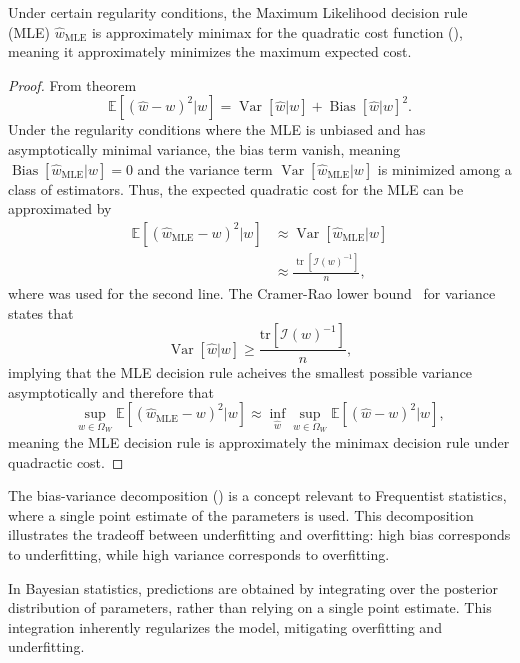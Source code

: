 \begin{corollary}
	\label{cor:MLE_minimax}
	Under certain regularity conditions, the Maximum Likelihood decision rule (MLE) $\hat{w}_{\text{MLE}}$ is approximately minimax for the quadratic cost function (), meaning it approximately minimizes the maximum expected cost.
	
	\begin{proof}
		From theorem 
		\begin{equation}
			\mathbb{E}[(\hat{w}-w)^2|w] = \operatorname{Var}[\hat{w}|w]+\operatorname{Bias}[\hat{w}|w]^2.
		\end{equation}
		Under the regularity conditions where the MLE is unbiased and has asymptotically minimal variance, the bias term vanish, meaning $\operatorname{Bias}[\hat{w}_{\text{MLE}}|w] = 0$ and the variance term $\operatorname{Var}[\hat{w}_{\text{MLE}}|w]$ is minimized among a class of estimators. Thus, the expected quadratic cost for the MLE can be approximated by
		\begin{equation}
			\begin{split}
				\mathbb{E}[(\hat{w}_{\text{MLE}}-w)^2|w] &\approx \operatorname{Var}[\hat{w}_{\text{MLE}}|w]\\
				&\approx \frac{\operatorname{tr}[\mathcal{I}(w)^{-1}]}{n},
			\end{split}
		\end{equation}
		where  was used for the second line. The Cramer-Rao lower bound~\citep{Rao1973Linear} for variance states that 
		\begin{equation}
			\operatorname{Var}[\hat{w}|w]\geq \frac{\text{tr}[\mathcal{I}(w)^{-1}]}{n},
		\end{equation}
		implying that the MLE decision rule acheives the smallest possible variance asymptotically and therefore that 
		\begin{equation}
			\sup_{w\in \Omega_W}\mathbb{E}[(\hat{w}_{\text{MLE}}-w)^2|w]\approx \inf_{\hat{w}} \sup_{w \in \Omega_W} \mathbb{E}[(\hat{w} - w)^2|w],
		\end{equation}
		meaning the MLE decision rule is approximately the minimax decision rule under quadractic cost.
	\end{proof}
\end{corollary}

\begin{example}
	The bias-variance decomposition () is a concept relevant to Frequentist statistics, where a single point estimate of the parameters is used. This decomposition illustrates the tradeoff between underfitting and overfitting: high bias corresponds to underfitting, while high variance corresponds to overfitting. \newline
	
	In Bayesian statistics, predictions are obtained by integrating over the posterior distribution of parameters, rather than relying on a single point estimate. This integration inherently regularizes the model, mitigating overfitting and underfitting.
\end{example}


